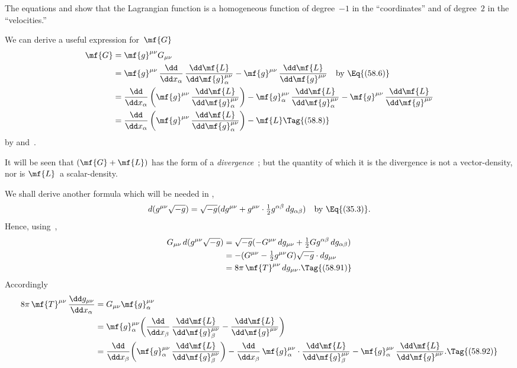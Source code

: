 \documentclass[12pt]{book}
\begin{document}
The equations  and  show that the Lagrangian function is a
homogeneous function of degree~$-1$ in the ``coordinates'' and of degree~$2$ in
the ``velocities.''

We can derive a useful expression for~$\mf{G}$
\begin{align*}
  \mf{G}
  &= \mf{g}^{\mu\nu} G_{\mu\nu} \\
  &= \mf{g}^{\mu\nu}\, \frac{\dd}{\dd x_{\alpha}}\, \frac{\dd\mf{L}}{\dd\mf{g}_{\alpha}^{\mu\nu}}
  - \mf{g}^{\mu\nu}\, \frac{\dd\mf{L}}{\dd\mf{g}^{\mu\nu}}\quad\text{by~\Eq{(58.6)}} \\
  &= \frac{\dd}{\dd x_{\alpha}} \left(\mf{g}^{\mu\nu}\, \frac{\dd\mf{L}}{\dd\mf{g}_{\alpha}^{\mu\nu}}\right)
  - \mf{g}_{\alpha}^{\mu\nu}\, \frac{\dd\mf{L}}{\dd\mf{g}_{\alpha}^{\mu\nu}}
  - \mf{g}^{\mu\nu}\, \frac{\dd\mf{L}}{\dd\mf{g}^{\mu\nu}} \\
  &= \frac{\dd}{\dd x_{\alpha}} \left(\mf{g}^{\mu\nu}\, \frac{\dd\mf{L}}{\dd\mf{g}_{\alpha}^{\mu\nu}}\right) - \mf{L}
  \Tag{(58.8)}
\end{align*}
by  and~.

It will be seen that $(\mf{G} + \mf{L})$ has the form of a \emph{divergence}~; but the
quantity of which it is the divergence is not a vector\hyp{}density, nor is $\mf{L}$~a scalar\hyp{}density.

We shall derive another formula which will be needed in ,
\[
d(g^{\mu\nu} \sqrt{-g})
= \sqrt{-g} (dg^{\mu\nu} + g^{\mu\nu} \cdot \tfrac{1}{2} g^{\alpha\beta}\, dg_{\alpha\beta})
\quad\text{by~\Eq{(35.3)}.}
\]
Hence, using~,
\begin{align*}
  G_{\mu\nu}\, d(g^{\mu\nu} \sqrt{-g})
  &= \sqrt{-g} (-G^{\mu\nu}\, dg_{\mu\nu} + \tfrac{1}{2} Gg^{\alpha\beta}\, dg_{\alpha\beta}) \\
  &= -(G^{\mu\nu} - \tfrac{1}{2}g^{\mu\nu}G) \sqrt{-g} \cdot dg_{\mu\nu} \\
  &= 8\pi\, \mf{T}^{\mu\nu}\, dg_{\mu\nu}.
  \Tag{(58.91)}
\end{align*}
Accordingly
\begin{align*}
  8\pi\, \mf{T}^{\mu\nu}\, \frac{\dd g_{\mu\nu}}{\dd x_{\alpha}}
  &= G_{\mu\nu} \mf{g}_{\alpha}^{\mu\nu} \\
  &= \mf{g}_{\alpha}^{\mu\nu} \biggl(
  \frac{\dd}{\dd x_{\beta}}\, \frac{\dd\mf{L}}{\dd\mf{g}_{\beta}^{\mu\nu}}
  - \frac{\dd\mf{L}}{\dd\mf{g}^{\mu\nu}}\biggr) \\
  &= \frac{\dd}{\dd x_{\beta}} \biggl(\mf{g}_{\alpha}^{\mu\nu}\, \frac{\dd\mf{L}}{\dd\mf{g}_{\beta}^{\mu\nu}}\biggr)
  - \frac{\dd}{\dd x_{\beta}}\, \mf{g}_{\alpha}^{\mu\nu} \cdot \frac{\dd\mf{L}}{\dd\mf{g}_{\beta}^{\mu\nu}}
  - \mf{g}_{\alpha}^{\mu\nu}\, \frac{\dd\mf{L}}{\dd\mf{g}^{\mu\nu}}.
  \Tag{(58.92)}
\end{align*}
\end{document}
